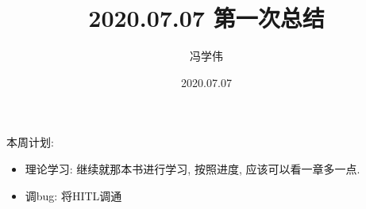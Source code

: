 \documentclass[UTF8,a4paper,10pt,nocolorlinks]{ctexart}
\title{
    \huge{\textbf{2020.07.07 第一次总结}}\\
}
\author{冯学伟}
\date{2020.07.07}
\begin{document}
    \maketitle
    
   
    本周计划: 
    \begin{itemize}
      \item 理论学习: 继续就那本书进行学习, 按照进度, 应该可以看一章多一点.
      \item 调bug: 将HITL调通
    \end{itemize}
\end{document}
